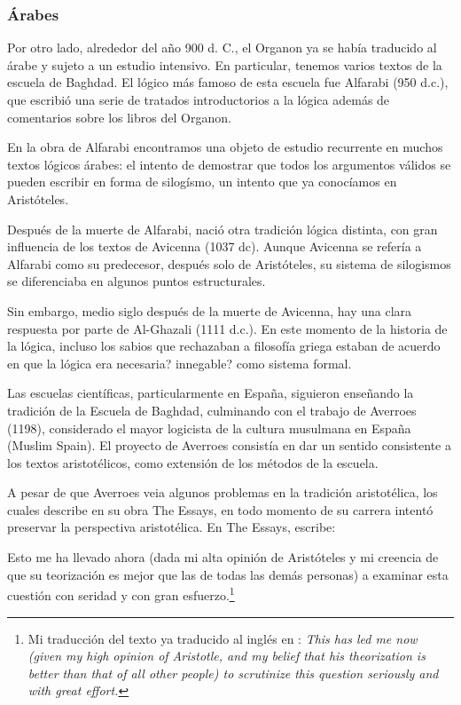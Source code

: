 \documentclass{article}
\begin{document}
\subsubsection{Árabes}

Por otro lado, alrededor del año 900 d. C., el Organon ya se había traducido al árabe y sujeto a un estudio intensivo. En particular, tenemos varios textos de la escuela de Baghdad. El lógico más famoso de esta escuela fue Alfarabi (950 d.c.), que escribió una serie de tratados introductorios a la lógica además de comentarios sobre los libros del Organon.

En la obra de Alfarabi encontramos una objeto de estudio recurrente en muchos textos lógicos árabes: el intento de demostrar que todos los argumentos válidos se pueden escribir en forma de silogísmo, un intento que ya conocíamos en Aristóteles.

Después de la muerte de Alfarabi, nació otra tradición lógica distinta, con gran influencia de los textos de Avicenna (1037 dc). Aunque Avicenna se refería a Alfarabi como su predecesor, después solo de Aristóteles, su sistema de silogismos se diferenciaba en algunos puntos estructurales.

Sin embargo, medio siglo después de la muerte de Avicenna, hay una clara respuesta por parte de Al-Ghazali (1111 d.c.). En este momento de la historia de la lógica, incluso los sabios que rechazaban a filosofía griega estaban de acuerdo en que la lógica era necesaria? innegable? como sistema formal.

Las escuelas científicas, particularmente en España, siguieron enseñando la tradición de la Escuela de Baghdad, culminando con el trabajo de Averroes (1198), considerado el mayor logicista de la cultura musulmana en España (Muslim Spain). El proyecto de Averroes consistía en dar un sentido consistente a los textos aristotélicos, como extensión de los métodos de la escuela.

A pesar de que Averroes veia algunos problemas en la tradición aristotélica, los cuales describe en su obra The Essays, en todo momento de su carrera intentó preservar la perspectiva aristotélica\cite{street2001arabic}. En The Essays, escribe:

\begin{displayquote}
    Esto me ha llevado ahora (dada mi alta opinión de Aristóteles y mi creencia de que su teorización es mejor que las de todas las demás personas) a examinar esta cuestión con seridad y con gran esfuerzo.\footnote{Mi traducción del texto ya traducido al inglés en \cite{street2001arabic}: \textit{This has led me now
    (given my high opinion of Aristotle, and my belief that his theorization is better than that of all other people) to scrutinize this question seriously and
    with great effort.}}
\end{displayquote}
\end{document}
